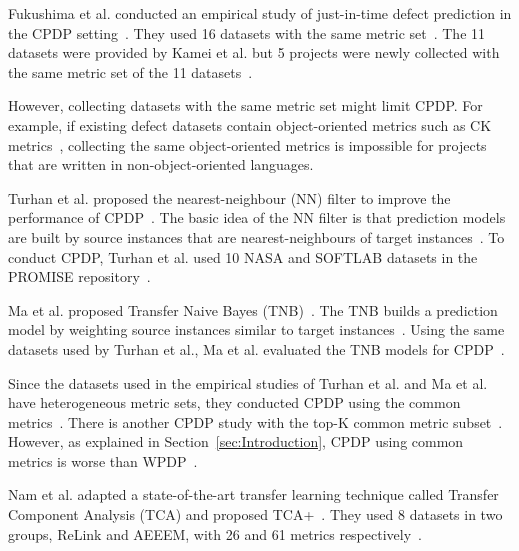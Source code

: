 Fukushima et al. conducted an empirical study of just-in-time defect prediction
in the CPDP setting~\cite{Fukushima14}. They used 16
datasets with the same metric set~\cite{Fukushima14}. The 11 datasets were
provided by Kamei et al. but 5 projects were newly collected with the same metric
set of the 11 datasets~\cite{Fukushima14,Kamei13}.

However, collecting datasets with the
same metric set might limit CPDP. For example, if
existing defect datasets contain object-oriented metrics such as CK
metrics~\cite{Basili96}, collecting the same object-oriented metrics is
impossible for projects that are written in non-object-oriented languages.

Turhan et al. proposed the nearest-neighbour (NN) filter to improve the
performance of CPDP~\cite{Turhan09}. The basic idea of the NN
filter is that prediction models are built by source instances that are
nearest-neighbours of target instances~\cite{Turhan09}. To conduct
CPDP, Turhan et al. used 10 NASA and SOFTLAB datasets in the
PROMISE repository~\cite{promise12,Turhan09}.

Ma et al. proposed Transfer Naive Bayes (TNB)~\cite{Ma12}. The TNB builds a
prediction model by weighting source instances similar to target
instances~\cite{Ma12}. Using the same datasets used by Turhan et al., Ma et al.
evaluated the TNB models for CPDP~\cite{Ma12,Turhan09}.

Since the datasets used in the empirical studies of Turhan et al. and Ma et al.
have heterogeneous metric sets, they conducted CPDP using the common
metrics~\cite{Ma12,Turhan09}. There is another CPDP study with the top-K
common metric subset~\cite{He14subset}. However, as explained in
Section~\ref{sec:Introduction}, CPDP using common metrics is
worse than WPDP~\cite{He14subset,Turhan09}.



Nam et al. adapted a state-of-the-art
transfer learning technique called Transfer Component Analysis (TCA) and
proposed TCA+~\cite{Nam13}. They used 8
datasets in two groups, ReLink and AEEEM, with 26 and 61 metrics
respectively~\cite{Nam13}.
% 

